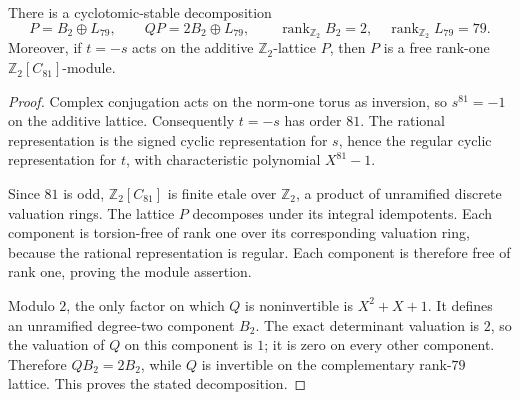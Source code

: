 \begin{lemma}
\label{lem:163-integral-pair-decomposition}
There is a cyclotomic-stable decomposition
\[
 P=B_2\oplus L_{79},\qquad QP=2B_2\oplus L_{79},
 \qquad
 \operatorname{rank}_{\mathbb Z_2}B_2=2,\quad
 \operatorname{rank}_{\mathbb Z_2}L_{79}=79.
\]
Moreover, if \(t=-s\) acts on the additive
\(\mathbb Z_2\)-lattice \(P\), then \(P\) is a free
rank-one \(\mathbb Z_2[C_{81}]\)-module.
\end{lemma}
\begin{proof}
Complex conjugation acts on the norm-one torus as
inversion, so \(s^{81}=-1\) on the additive lattice.
Consequently \(t=-s\) has order \(81\).
The rational representation is the signed cyclic
representation for \(s\), hence the regular cyclic
representation for \(t\), with characteristic
polynomial \(X^{81}-1\).

Since \(81\) is odd, \(\mathbb Z_2[C_{81}]\) is finite
etale over \(\mathbb Z_2\), a product of unramified
discrete valuation rings. The lattice \(P\) decomposes
under its integral idempotents. Each component is
torsion-free of rank one over its corresponding
valuation ring, because the rational representation
is regular. Each component is therefore free of
rank one, proving the module assertion.

Modulo \(2\), the only factor on which \(Q\) is
noninvertible is \(X^2+X+1\). It defines an unramified
degree-two component \(B_2\).
The exact determinant valuation is \(2\), so the
valuation of \(Q\) on this component is \(1\);
it is zero on every other component.
Therefore \(Q B_2=2B_2\), while \(Q\) is invertible
on the complementary rank-\(79\) lattice.
This proves the stated decomposition.
\end{proof}
